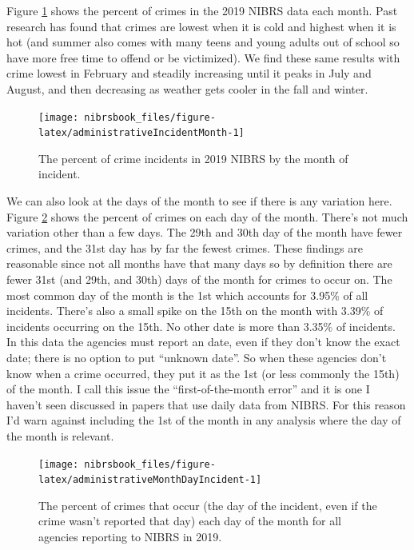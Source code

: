 \documentclass[
  12pt,
  openany]{book}
\begin{document}
Figure \ref{fig:administrativeIncidentMonth} shows the percent of crimes in the 2019 NIBRS data each month. Past research has found that crimes are lowest when it is cold and highest when it is hot (and summer also comes with many teens and young adults out of school so have more free time to offend or be victimized). We find these same results with crime lowest in February and steadily increasing until it peaks in July and August, and then decreasing as weather gets cooler in the fall and winter.

\begin{figure}

{\centering \texttt{[image: nibrsbook\_files/figure-latex/administrativeIncidentMonth-1]} 

}

\caption{The percent of crime incidents in 2019 NIBRS by the month of incident.}\label{fig:administrativeIncidentMonth}
\end{figure}

We can also look at the days of the month to see if there is any variation here. Figure \ref{fig:administrativeMonthDayIncident} shows the percent of crimes on each day of the month. There's not much variation other than a few days. The 29th and 30th day of the month have fewer crimes, and the 31st day has by far the fewest crimes. These findings are reasonable since not all months have that many days so by definition there are fewer 31st (and 29th, and 30th) days of the month for crimes to occur on. The most common day of the month is the 1st which accounts for 3.95\% of all incidents. There's also a small spike on the 15th on the month with 3.39\% of incidents occurring on the 15th. No other date is more than 3.35\% of incidents. In this data the agencies must report an date, even if they don't know the exact date; there is no option to put ``unknown date''. So when these agencies don't know when a crime occurred, they put it as the 1st (or less commonly the 15th) of the month. I call this issue the ``first-of-the-month error'' and it is one I haven't seen discussed in papers that use daily data from NIBRS. For this reason I'd warn against including the 1st of the month in any analysis where the day of the month is relevant.

\begin{figure}

{\centering \texttt{[image: nibrsbook\_files/figure-latex/administrativeMonthDayIncident-1]} 

}

\caption{The percent of crimes that occur (the day of the incident, even if the crime wasn't reported that day) each day of the month for all agencies reporting to NIBRS in 2019.}\label{fig:administrativeMonthDayIncident}
\end{figure}
\end{document}

